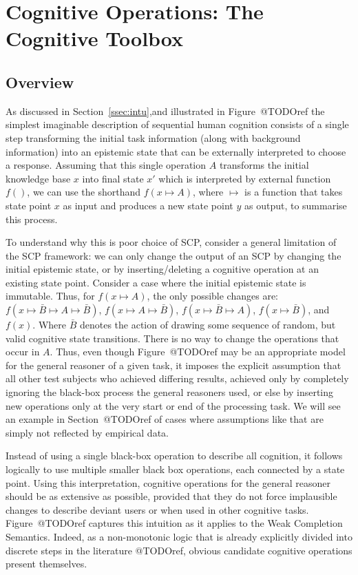 \chapter{Cognitive Operations: The Cognitive Toolbox} \label{chp:toolbox}
\section{Overview}
As discussed in Section~\ref{ssec:intu},and illustrated in Figure~@TODOref the simplest imaginable description of sequential human cognition consists of a single step transforming the initial task information (along with background information) into an epistemic state that can be externally interpreted to choose a response. Assuming that this single operation $A$ transforms the initial knowledge base $x$ into final state $x'$ which is interpreted by external function $f()$, we can use the shorthand $f(x \longmapsto A)$, where $\longmapsto$ is a function that takes state point $x$ as input and produces a new state point $y$ as output, to summarise this process. 

To understand why this is poor choice of SCP, consider a general limitation of the SCP framework: we can only change the output of an SCP by changing the initial epistemic state, or by inserting/deleting a cognitive operation at an existing state point. Consider a case where the initial epistemic state is immutable. Thus, for $f(x \longmapsto A)$, the only possible changes are: $f(x \longmapsto \bar{B} \longmapsto A \longmapsto \bar{B})$, $f(x \longmapsto A \longmapsto \bar{B})$, $f(x \longmapsto \bar{B} \longmapsto A)$, $f(x \longmapsto \bar{B})$, and $f(x)$. Where $\bar{B}$ denotes the action of drawing some sequence of random, but valid cognitive state transitions. There is no way to change the operations that occur in $A$. Thus, even though Figure~@TODOref may be an appropriate model for the general reasoner of a given task, it imposes the explicit assumption that all other test subjects who achieved differing results, achieved only by completely ignoring the black-box process the general reasoners used, or else by inserting new operations only at the very start or end of the processing task. We will see an example in Section~@TODOref of cases where assumptions like that are simply not reflected by empirical data. 

Instead of using a single black-box operation to describe all cognition, it follows logically to use multiple smaller black box operations, each connected by a state point. Using this interpretation, cognitive operations for the general reasoner should be as extensive as possible, provided that they do not force implausible changes to describe deviant users or when used in other cognitive tasks. Figure~@TODOref captures this intuition as it applies to the Weak Completion Semantics. Indeed, as a non-monotonic logic that is already explicitly divided into discrete steps in the literature @TODOref, obvious candidate cognitive operations present themselves.

